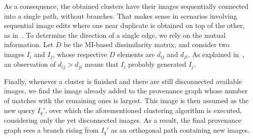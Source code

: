 As a consequence, the obtained clusters have their images sequentially connected into a single path, without branches.
That makes sense in scenarios involving sequential image edits where one near duplicate is obtained on top of the other, as in~\cite{nist2017dataset}.
To determine the direction of a single edge, we rely on the mutual information.
Let $D$ be the MI-based dissimilarity matrix, and consider two images $I_i$ and $I_j$, whose respective $D$ elements are $d_{ij}$ and $d_{ji}$.
As explained in~\cite{Oliveira_2016}, an observation of $d_{ij} > d_{ji}$ means that $I_i$ probably generated $I_j$.

Finally, whenever a cluster is finished and there are still disconnected available images, we find the image already added to the provenance graph whose number of matches with the remaining ones is largest.
This image is then assumed as the new query $I_q'$, over which the aforementioned clustering algorithm is executed, considering only the yet disconnected images.
As a result, the final provenance graph sees a branch rising from $I_q'$ as an orthogonal path containing new images.
